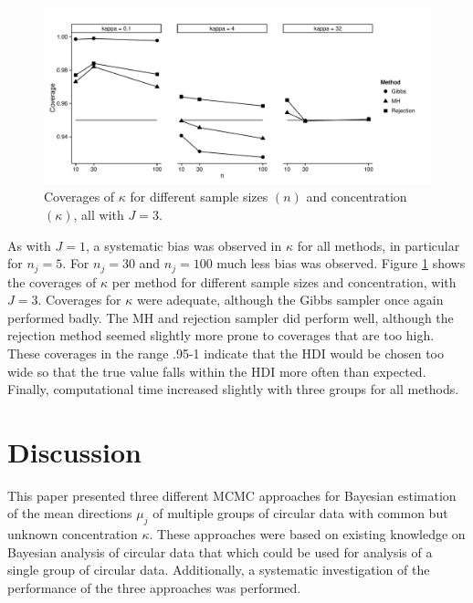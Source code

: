 \documentclass[]{gSCS2e}
\theoremstyle{plain}
\theoremstyle{definition}
\theoremstyle{remark}
\begin{document}
\begin{figure}[bt]
\includegraphics[width=\textwidth]{Coverages.pdf}
\caption{Coverages of $\kappa$ for different sample sizes $(n)$ and concentration $(\kappa)$, all with $J=3$.}
\label{coverage}
\end{figure}



As with $J=1$, a systematic bias was observed in $\kappa$ for all methods, in particular for $n_j=5$. For $n_j=30$ and $n_j=100$ much less bias was observed. Figure \ref{coverage} shows the coverages of $\kappa$ per method for different sample sizes and concentration, with $J=3$. Coverages for $\kappa$ were adequate, although the Gibbs sampler once again performed badly.  The MH and rejection sampler did perform well, although the rejection method seemed slightly more prone to coverages that are too high. These coverages in the range .95-1 indicate that the HDI would be chosen too wide so that the true value falls within the HDI more often than expected. Finally, computational time increased slightly with three groups for all methods.



\section{Discussion \label{discussion}}

This paper presented three different MCMC approaches for Bayesian estimation of the mean directions $\mu_j$ of multiple groups of circular data with common but unknown concentration $\kappa$. These approaches were based on existing knowledge on Bayesian analysis of circular data that which could be used for analysis of a single group of circular data. Additionally, a systematic investigation of the performance of the three approaches was performed. 
\end{document}
